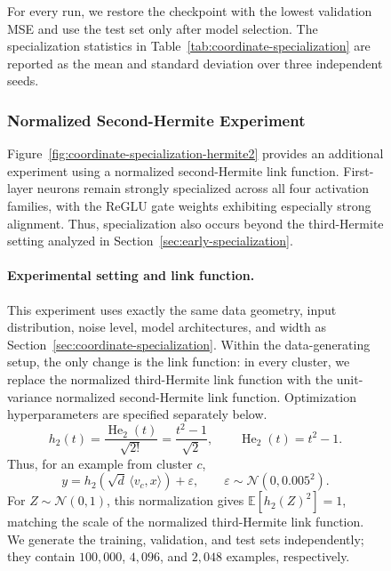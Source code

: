 \documentclass{article}
\newcounter{setting}[section]
\newcounter{model}[section]
\begin{document}
\begin{figure}
For every run, we restore the
checkpoint with the lowest validation MSE and use the test set only after
model selection. The specialization statistics in
Table~\ref{tab:coordinate-specialization} are reported as the mean and
standard deviation over three independent seeds.

\clearpage

\subsubsection{Normalized Second-Hermite Experiment}
\label{app:hermite2-specialization-experiment}

Figure~\ref{fig:coordinate-specialization-hermite2} provides an additional
experiment using a normalized second-Hermite link function. First-layer
neurons remain strongly specialized across all four activation families, with
the ReGLU gate weights exhibiting especially strong alignment. Thus,
specialization also occurs beyond the third-Hermite setting analyzed in
Section~\ref{sec:early-specialization}.




\paragraph{Experimental setting and link function.}
This experiment uses exactly the same data geometry, input distribution, noise level, model architectures, and width as Section~\ref{sec:coordinate-specialization}. Within the data-generating setup, the only change is the link function: in every cluster, we replace the normalized third-Hermite link function with the unit-variance normalized second-Hermite link function. Optimization hyperparameters are specified separately below.
\[
    h_2(t)=\frac{\operatorname{He}_2(t)}{\sqrt{2!}}
          =\frac{t^2-1}{\sqrt{2}},
    \qquad
    \operatorname{He}_2(t)=t^2-1.
\]
Thus, for an example from cluster \(c\),
\[
    y=h_2\!\left(\sqrt d\,\langle v_c,x\rangle\right)+\varepsilon,
    \qquad
    \varepsilon\sim\mathcal N(0,0.005^2).
\]
For \(Z\sim\mathcal N(0,1)\), this normalization gives
\(\mathbb E[h_2(Z)^2]=1\), matching the scale of the normalized
third-Hermite link function. We generate the training, validation, and test
sets independently; they contain \(100{,}000\), \(4{,}096\), and \(2{,}048\)
examples, respectively.


\begin{figure}[H]
    \centering

    \small
    \renewcommand{\arraystretch}{1.12}
    \setlength{\tabcolsep}{5pt}


\end{figure}
\end{figure}
\end{document}
